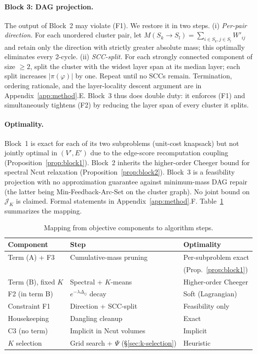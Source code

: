 \documentclass[table, 11pt]{article}
\begin{document}
\paragraph{Block 3: DAG projection.}
The output of Block~2 may violate (F1). We restore it in two steps.
(i) \emph{Per-pair direction.} For each unordered cluster pair, let
$M(S_k \!\to\! S_l) = \sum_{i \in S_k, j \in S_l} W'_{ij}$ and
retain only the direction with strictly greater absolute mass; this
optimally eliminates every 2-cycle. (ii) \emph{SCC-split.} For each
strongly connected component of size $\ge 2$, split the cluster
with the widest layer span at its median layer; each split
increases $|\pi(\varphi)|$ by one. Repeat until no SCCs remain.
Termination, ordering rationale, and the layer-locality descent
argument are in Appendix~\ref{app:method}.E. Block~3 thus does
double duty: it enforces (F1) and simultaneously tightens (F2) by
reducing the layer span of every cluster it splits.

\paragraph{Optimality.}
Block~1 is exact for each of its two subproblems (unit-cost
knapsack) but not jointly optimal in $(V', E')$ due to the
edge-score recomputation coupling
(Proposition~\ref{prop:block1}). Block~2 inherits the higher-order
Cheeger bound for spectral Ncut relaxation
(Proposition~\ref{prop:block2}). Block~3 is a feasibility
projection with no approximation guarantee against minimum-mass DAG
repair (the latter being Min-Feedback-Arc-Set on the cluster
graph). No joint bound on $\mathcal{J}_K$ is claimed. Formal
statements in Appendix~\ref{app:method}.F.
Table~\ref{tab:obj-algo} summarizes the mapping.

\begin{table}[t]
\centering
\caption{Mapping from objective components to algorithm steps.}
\label{tab:obj-algo}
\footnotesize
\begin{tabular}{@{}lll@{}}
\toprule
\textbf{Component} & \textbf{Step} & \textbf{Optimality}\\
\midrule
Term (A) + F3       & Cumulative-mass pruning & Per-subproblem exact \\
                    &                         & (Prop.~\ref{prop:block1}) \\
Term (B), fixed $K$ & Spectral + $K$-means    & Higher-order Cheeger \\
F2 (in term B)      & $e^{-\lambda \Delta_{ij}}$ decay & Soft (Lagrangian) \\
Constraint F1       & Direction + SCC-split   & Feasibility only \\
Housekeeping        & Dangling cleanup        & Exact \\
C3 (no term)        & Implicit in Ncut volumes & Implicit \\
$K$ selection       & Grid search + $\Psi$ (\S\ref{sec:k-selection}) & Heuristic \\
\bottomrule
\end{tabular}
\end{table}
\end{document}
